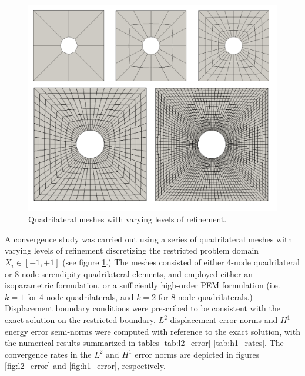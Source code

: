 \begin{figure}[!h]
  \centering
  \includegraphics[width=6.0in]{figures/plate_with_hole_meshes.pdf}
  \caption{Quadrilateral meshes with varying levels of refinement.}
  \label{fig:plate_with_hole_meshes}
\end{figure}
A convergence study was carried out using a series of quadrilateral meshes with varying levels of refinement discretizing the restricted problem domain $X_i \in [ -1, +1]$ (see figure \ref{fig:plate_with_hole_meshes}.) The meshes consisted of either 4-node quadrilateral or 8-node serendipity quadrilateral elements, and employed either an isoparametric formulation, or a sufficiently high-order PEM formulation (i.e. $k=1$ for 4-node quadrilaterals, and $k=2$ for 8-node quadrilaterals.) Displacement boundary conditions were prescribed to be consistent with the exact solution on the restricted boundary. $L^2$ displacement error norms and $H^1$ energy error semi-norms were computed with reference to the exact solution, with the numerical results summarized in tables \ref{tab:l2_error}-\ref{tab:h1_rates}. The convergence rates in the $L^2$ and $H^1$ error norms are depicted in figures \ref{fig:l2_error} and \ref{fig:h1_error}, respectively.
\newpage
